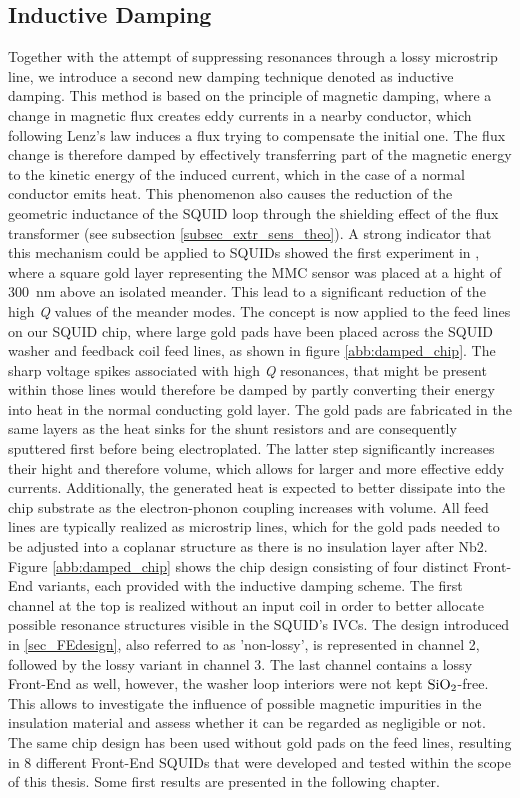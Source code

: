 \subsection{Inductive Damping}

Together with the attempt of suppressing resonances through a lossy microstrip line, we introduce a second new damping technique denoted as inductive damping. This method is based on the principle of magnetic damping, where a change in magnetic flux creates eddy currents in a nearby conductor, which following Lenz's law induces a flux trying to compensate the initial one. The flux change is therefore damped by effectively transferring part of the magnetic energy to the kinetic energy of the induced current, which in the case of a normal conductor emits heat. This phenomenon also causes the reduction of the geometric inductance of the SQUID loop through the shielding effect of the flux transformer (see subsection \ref{subsec_extr_sens_theo}). A strong indicator that this mechanism could be applied to SQUIDs showed the first experiment in \cite{Boyd2022}, where a square gold layer representing the MMC sensor was placed at a hight of \qty{300}{\nano\meter} above an isolated meander. This lead to a significant reduction of the high \textit{Q} values of the meander modes. The concept is now applied to the feed lines on our SQUID chip, where large gold pads have been placed across the SQUID washer and feedback coil feed lines, as shown in figure \ref{abb:damped_chip}. The sharp voltage spikes associated with high \textit{Q} resonances, that might be present within those lines would therefore be damped by partly converting their energy into heat in the normal conducting gold layer. The gold pads are fabricated in the same layers as the heat sinks for the shunt resistors and are consequently sputtered first before being electroplated. The latter step significantly increases their hight and therefore volume, which allows for larger and more effective eddy currents. Additionally, the generated heat is expected to better dissipate into the chip substrate as the electron-phonon coupling increases with volume. All feed lines are typically realized as microstrip lines, which for the gold pads needed to be adjusted into a coplanar structure as there is no insulation layer after Nb2. Figure \ref{abb:damped_chip} shows the chip design consisting of four distinct Front-End variants, each provided with the inductive damping scheme. The first channel at the top is realized without an input coil in order to better allocate possible resonance structures visible in the SQUID's IVCs. The design introduced in \ref{sec_FEdesign}, also referred to as 'non-lossy', is represented in channel 2, followed by the lossy variant in channel 3. The last channel contains a lossy Front-End as well, however, the washer loop interiors were not kept $\rm SiO_2$-free. This allows to investigate the influence of possible magnetic impurities in the insulation material and assess whether it can be regarded as negligible or not. The same chip design has been used without gold pads on the feed lines, resulting in 8 different Front-End SQUIDs that were developed and tested within the scope of this thesis. Some first results are presented in the following chapter.     

